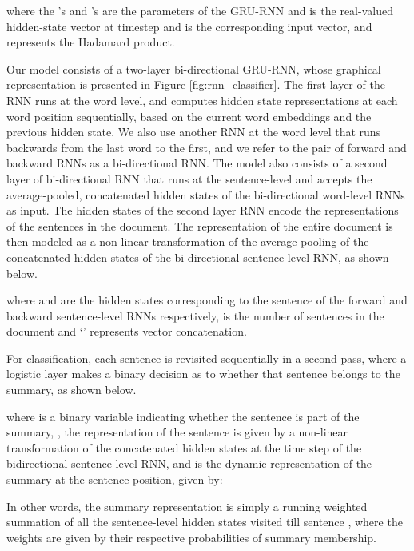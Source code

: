 \documentclass[letterpaper]{article}
\begin{document}
where the 's and 's are the parameters of the GRU-RNN and  is the real-valued hidden-state vector at timestep  and  is the corresponding input vector, and  represents the Hadamard product.

Our model consists of a two-layer bi-directional GRU-RNN, whose graphical representation is presented in Figure \ref{fig:rnn_classifier}. 
The first layer of the RNN runs at the word level, and computes hidden state representations at each word position sequentially, based on the current word embeddings and the previous hidden state. We also use another RNN at the word level that runs backwards from the last word to the first, and we refer to the pair of forward and backward RNNs as a bi-directional RNN. The model also consists of a second layer of bi-directional RNN that runs at the sentence-level and accepts the average-pooled, concatenated hidden states of the bi-directional word-level RNNs as input. The hidden states of the second layer RNN encode the representations of the sentences in the document. The representation of the entire document is then modeled as a non-linear transformation of the average pooling of the concatenated hidden states of the  bi-directional sentence-level RNN, as shown below.

where  and  are the hidden states corresponding to the  sentence of the forward and backward sentence-level RNNs respectively,  is the number of sentences in the document and `' represents vector concatenation. 

For classification, each sentence is revisited sequentially in a second pass, where a logistic layer makes a binary decision as to whether that sentence belongs to the summary, as shown below.

where  is a binary variable indicating whether the  sentence is part of the summary, , the representation of the sentence is given by a non-linear transformation of the concatenated hidden states at the  time step of the bidirectional sentence-level RNN, and  is the dynamic representation of the summary at the  sentence position, given by:

In other words, the summary representation is simply a running weighted summation of all the sentence-level hidden states visited till sentence , where the weights are given by their respective probabilities of summary membership.
\end{document}
